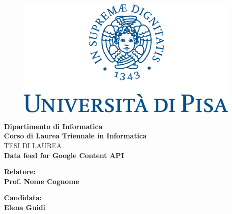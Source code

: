 \begin{titlepage} %
\begin{figure}[t] %
    \centering\includegraphics[width=0.98\textwidth]{marchio_unipi_pant541.png}
\end{figure}
\vspace{20mm}

\begin{Large}
 \begin{center}
	\textbf{Dipartimento di Informatica\\ Corso di Laurea Triennale in Informatica\\}
	\vspace{20mm}
    {\LARGE{TESI DI LAUREA}}\\
	\vspace{10mm}
	{\huge{\bf Data feed for Google Content API}}\\
\end{center}
\end{Large}


\vspace{36mm}
\begin{minipage}[t]{0.47\textwidth}
	{\large{\bf Relatore:\\ Prof. Nome Cognome}}
\end{minipage}
\hfill
\begin{minipage}[t]{0.47\textwidth}\raggedleft
	{\large{\bf Candidata: \\ Elena Guidi\\ }}
\end{minipage}

\vspace{25mm}

\hrulefill

\vspace{5mm}


\end{titlepage}